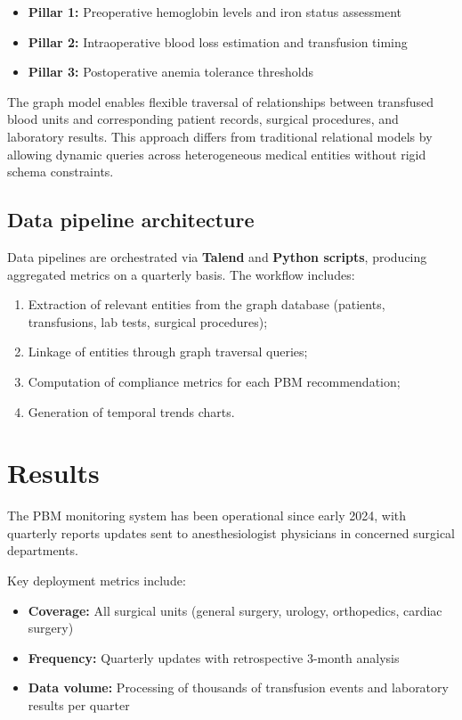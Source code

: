 \documentclass{IOS-Book-Article}
\begin{document}
\begin{itemize}
\item \textbf{Pillar 1:} Preoperative hemoglobin levels and iron status assessment
\item \textbf{Pillar 2:} Intraoperative blood loss estimation and transfusion timing
\item \textbf{Pillar 3:} Postoperative anemia tolerance thresholds
\end{itemize}

The graph model enables flexible traversal of relationships between transfused blood units and 
corresponding patient records, surgical procedures, and laboratory results. This approach differs 
from traditional relational models by allowing dynamic queries across heterogeneous medical entities 
without rigid schema constraints.

\subsection{Data pipeline architecture}

Data pipelines are orchestrated via \textbf{Talend} and \textbf{Python scripts}, producing aggregated 
metrics on a quarterly basis. The workflow includes:

\begin{enumerate}
\item Extraction of relevant entities from the graph database (patients, transfusions, lab tests, surgical procedures);
\item Linkage of entities through graph traversal queries;
\item Computation of compliance metrics for each PBM recommendation;
\item Generation of temporal trends charts.
\end{enumerate}

\section{Results}

The PBM monitoring system has been operational since early 2024, with quarterly reports updates sent 
to anesthesiologist physicians in concerned surgical departments. 

Key deployment metrics include:

\begin{itemize}
\item \textbf{Coverage:} All surgical units (general surgery, urology, orthopedics, cardiac surgery)
\item \textbf{Frequency:} Quarterly updates with retrospective 3-month analysis
\item \textbf{Data volume:} Processing of thousands of transfusion events and laboratory results per quarter
\end{itemize}
\end{document}
